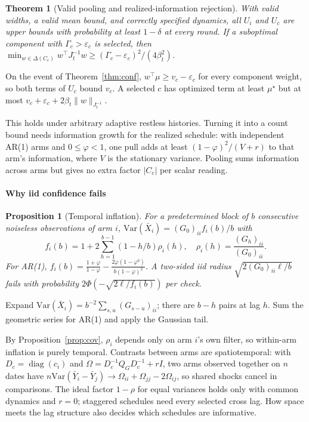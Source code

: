 \documentclass[conference]{IEEEtran}
\newtheorem{theorem}{Theorem}
\newtheorem{proposition}{Proposition}
\newcommand{\Var}{\mathrm{Var}}
\newcommand{\diag}{\operatorname{diag}}
\begin{document}
\begin{theorem}[Valid pooling and realized-information rejection]\label{thm:b1}
With valid widths, a valid mean bound, and correctly specified dynamics, all $U_i$ and $U_c$ are upper bounds with probability at least $1-\delta$ at every round. If a suboptimal component with $\Gamma_c>\varepsilon_c$ is selected, then $\min_{w\in\Delta(C_c)}w^\top J_t^{-1}w\ge(\Gamma_c-\varepsilon_c)^2/(4\beta_t^2)$.
\end{theorem}

\begin{IEEEproof}[Sketch]
On the event of Theorem~\ref{thm:conf}, $w^\top\mu\ge v_c-\varepsilon_c$ for every component weight, so both terms of $U_c$ bound $v_c$. A selected $c$ has optimized term at least $\mu^\star$ but at most $v_c+\varepsilon_c+2\beta_t\|w\|_{J_t^{-1}}$.
\end{IEEEproof}

This holds under arbitrary adaptive restless histories. Turning it into a count bound needs information growth for the realized schedule: with independent AR(1) arms and $0\le\varphi<1$, one pull adds at least $(1-\varphi)^2/(V+r)$ to that arm's information, where $V$ is the stationary variance. Pooling sums information across arms but gives no extra factor $|C_c|$ per scalar reading.

\paragraph*{Why iid confidence fails}
\begin{proposition}[Temporal inflation]\label{prop:b2}
For a predetermined block of $b$ consecutive noiseless observations of arm $i$, $\Var(\bar X_i)=(G_0)_{ii}f_i(b)/b$ with
\[
f_i(b)=1+2\textstyle\sum_{h=1}^{b-1}(1-h/b)\rho_i(h),\quad\rho_i(h)=\frac{(G_h)_{ii}}{(G_0)_{ii}}.
\]
For AR(1), $f_i(b)=\frac{1+\varphi}{1-\varphi}-\frac{2\varphi(1-\varphi^b)}{b(1-\varphi)^2}$. A two-sided iid radius $\sqrt{2(G_0)_{ii}\ell/b}$ fails with probability $2\Phi(-\sqrt{2\ell/f_i(b)})$ per check.
\end{proposition}

\begin{IEEEproof}[Sketch]
Expand $\Var(\bar X_i)=b^{-2}\sum_{s,u}(G_{s-u})_{ii}$; there are $b-h$ pairs at lag $h$. Sum the geometric series for AR(1) and apply the Gaussian tail.
\end{IEEEproof}

By Proposition~\ref{prop:cov}, $\rho_i$ depends only on arm $i$'s own filter, so within-arm inflation is purely temporal. Contrasts between arms are spatiotemporal: with $D_c=\diag(c_i)$ and $\Omega=D_c^{-1}Q_GD_c^{-1}+rI$, two arms observed together on $n$ dates have $n\Var(\bar Y_i-\bar Y_j)\to\Omega_{ii}+\Omega_{jj}-2\Omega_{ij}$, so shared shocks cancel in comparisons. The ideal factor $1-\rho$ for equal variances holds only with common dynamics and $r=0$; staggered schedules need every selected cross lag. How space meets the lag structure also decides which schedules are informative.
\end{document}
